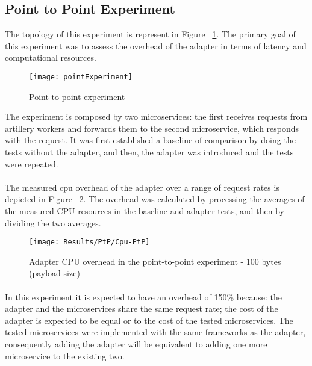 \subsection{Point to Point Experiment}

The topology of this experiment is represent in Figure ~\ref{fig:point}.
The primary goal of this experiment was to assess the overhead of the adapter in terms of latency and computational resources.

\begin{figure}[htbp]
    \centering
    \texttt{[image: pointExperiment]}
    \caption{Point-to-point experiment}
    \label{fig:point}
\end{figure}

The experiment is composed by two microservices:
the first receives requests from artillery workers and forwards them to the second microservice, which responds with the request.
It was first established a baseline of comparison
by doing the tests without the adapter, and then, the adapter was introduced and the tests were repeated.

\paragraph{}

The measured cpu overhead of the adapter over a
range of request rates is depicted in Figure ~\ref{fig:cpuPtp}.
The overhead was calculated by processing the averages of the measured CPU resources in the baseline and adapter tests, and then by dividing the two averages.

\begin{figure}[htbp]
    \centering
    \texttt{[image: Results/PtP/Cpu-PtP]}
    \caption{Adapter CPU overhead in the point-to-point experiment - 100 bytes (payload size)}
    \label{fig:cpuPtp}
\end{figure}

\paragraph{}

In this experiment it is expected to have an overhead of 150\% because: the adapter and the microservices share the same request rate;
the cost of the adapter is expected to be equal or to the cost of the tested microservices.
The tested microservices were implemented with the same frameworks as the adapter, consequently adding the adapter will be equivalent to adding one more microservice to the existing two.

